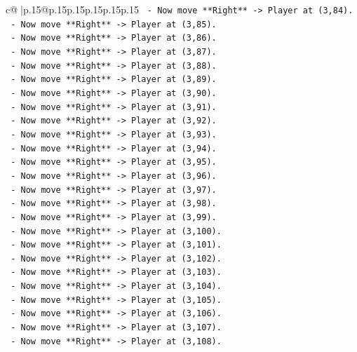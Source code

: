 \documentclass{article}
\begin{document}
{\begin{supertabular}{c@{$\;$}|p{.15\linewidth}@{}p{.15\linewidth}p{.15\linewidth}p{.15\linewidth}p{.15\linewidth}p{.15\linewidth}}
{{{\texttt{    {-}   Now move **Right** {-}> Player at (3,84).} \\
\texttt{    {-}   Now move **Right** {-}> Player at (3,85).} \\
\texttt{    {-}   Now move **Right** {-}> Player at (3,86).} \\
\texttt{    {-}   Now move **Right** {-}> Player at (3,87).} \\
\texttt{    {-}   Now move **Right** {-}> Player at (3,88).} \\
\texttt{    {-}   Now move **Right** {-}> Player at (3,89).} \\
\texttt{    {-}   Now move **Right** {-}> Player at (3,90).} \\
\texttt{    {-}   Now move **Right** {-}> Player at (3,91).} \\
\texttt{    {-}   Now move **Right** {-}> Player at (3,92).} \\
\texttt{    {-}   Now move **Right** {-}> Player at (3,93).} \\
\texttt{    {-}   Now move **Right** {-}> Player at (3,94).} \\
\texttt{    {-}   Now move **Right** {-}> Player at (3,95).} \\
\texttt{    {-}   Now move **Right** {-}> Player at (3,96).} \\
\texttt{    {-}   Now move **Right** {-}> Player at (3,97).} \\
\texttt{    {-}   Now move **Right** {-}> Player at (3,98).} \\
\texttt{    {-}   Now move **Right** {-}> Player at (3,99).} \\
\texttt{    {-}   Now move **Right** {-}> Player at (3,100).} \\
\texttt{    {-}   Now move **Right** {-}> Player at (3,101).} \\
\texttt{    {-}   Now move **Right** {-}> Player at (3,102).} \\
\texttt{    {-}   Now move **Right** {-}> Player at (3,103).} \\
\texttt{    {-}   Now move **Right** {-}> Player at (3,104).} \\
\texttt{    {-}   Now move **Right** {-}> Player at (3,105).} \\
\texttt{    {-}   Now move **Right** {-}> Player at (3,106).} \\
\texttt{    {-}   Now move **Right** {-}> Player at (3,107).} \\
\texttt{    {-}   Now move **Right** {-}> Player at (3,108).} \\
}}}
\end{supertabular}}
\end{document}
